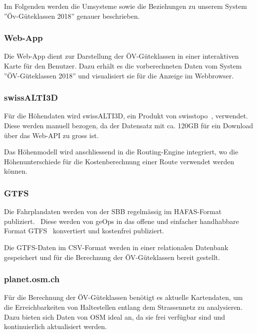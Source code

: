 Im Folgenden werden die Umsysteme sowie die Beziehungen zu unserem System ''Öv-Güteklassen 2018'' genauer beschrieben.

\subsubsection{Web-App}
\label{subsystem:Web-App}

Die Web-App dient zur Darstellung der ÖV-Güteklassen in einer interaktiven Karte für den Benutzer.
Dazu erhält es die vorberechneten Daten vom System ''ÖV-Güteklassen 2018'' und visualisiert sie für die Anzeige im Webbrowser.

\subsubsection{swissALTI3D}
\label{subsystem:swissALTI3D}

Für die Höhendaten wird swissALTI3D, ein Produkt von swisstopo~\cite{swissalti3d_swisstopo}, verwendet.
Diese werden manuell bezogen, da der Datensatz mit ca. 120GB für ein Download über das Web-API zu gross ist.

Das Höhenmodell wird anschliessend in die Routing-Engine integriert, wo die Höhenunterschiede für die Kostenberechnung einer Route verwendet werden können.

\subsubsection{GTFS}
\label{subsystem:GTFS}

Die Fahrplandaten werden von der SBB regelmässig im HAFAS-Format publiziert.~\cite{sbb_hafas_spec}
Diese werden von geOps in das offene und einfacher handhabbare Format \ac{GTFS}~\cite{gtfs_spec} konvertiert und kostenfrei publiziert.~\cite{geops_fahrplandaten}

Die \ac{GTFS}-Daten im CSV-Format werden in einer relationalen Datenbank gespeichert und für die Berechnung der ÖV-Güteklassen bereit gestellt.

\subsubsection{planet.osm.ch}
\label{subsystem:planet.osm.ch}

Für die Berechnung der ÖV-Güteklassen benötigt es aktuelle Kartendaten, um die Erreichbarkeiten von Haltestellen entlang dem Strassennetz zu analysieren.
Dazu bieten sich Daten von \ac{OSM} ideal an, da sie frei verfügbar sind und kontinuierlich aktualisiert werden.

